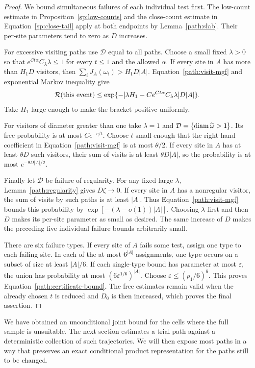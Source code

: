 \begin{proof}
We bound simultaneous failures of each individual test first.
The low-count estimate in Proposition~\ref{sp:low-counts} and the
close-count estimate in Equation~\eqref{sp:close-tail} apply at both
endpoints by Lemma~\ref{path:slab}.  Their per-site parameters tend
to zero as $D$ increases.

For excessive visiting paths use $\mathcal D$ equal to all paths.
Choose a small fixed $\lambda>0$ so that
$e^{Ct\alpha}C_\lambda\lambda\le1$ for every $t\le1$ and the
allowed $\alpha$.  If every site in $A$ has more than $H_1D$
visitors, then $\sum_iJ_A(\omega_i)>H_1D|A|$.
Equation~\eqref{path:visit-mgf} and exponential Markov inequality give
\[
 \mathcal R(\text{this event})
 \le\exp\{-[\lambda H_1-Ce^{Ct\alpha}C_\lambda\lambda]D|A|\}.
\]
Take $H_1$ large enough to make the bracket positive uniformly.

For visitors of diameter greater than one take $\lambda=1$ and
$\mathcal D=\{\operatorname{diam}\widetilde\omega>1\}$.
Its free probability is at most $Ce^{-c/t}$.
Choose $t$ small enough that the right-hand coefficient in
Equation~\eqref{path:visit-mgf} is at most $\theta/2$.
If every site in $A$ has at least $\theta D$ such visitors, their
sum of visits is at least $\theta D|A|$, so the probability is at
most $e^{-\theta D|A|/2}$.

Finally let $\mathcal D$ be failure of regularity.  For any fixed
large $\lambda$, Lemma~\ref{path:regularity} gives
$D\zeta\to0$.  If every site in $A$ has a nonregular visitor, the
sum of visits by such paths is at least $|A|$.  Thus
Equation~\eqref{path:visit-mgf} bounds this probability by
$\exp[-(\lambda-o(1))|A|]$.  Choosing $\lambda$ first and then
$D$ makes its per-site parameter as small as desired.  The same
increase of $D$ makes the preceding five individual failure bounds
arbitrarily small.

There are six failure types.  If every site of $A$ fails some test,
assign one type to each failing site.  In each of the at most
$6^{|A|}$ assignments, one type occurs on a subset of size at least
$|A|/6$.  If each single-type bound has parameter at most
$\varepsilon$, the union has probability at most
$(6\varepsilon^{1/6})^{|A|}$.  Choose
$\varepsilon\le(p_1/6)^6$.  This proves
Equation~\eqref{path:certificate-bound}.  The free estimates remain
valid when the already chosen $t$ is reduced and $D_0$ is then
increased, which proves the final assertion.
\end{proof}

We have obtained an unconditional joint bound for the cells where the
full sample is unsuitable.  The next section estimates a trial path
against a deterministic collection of such trajectories.  We will then
expose most paths in a way that preserves an exact conditional product
representation for the paths still to be changed.
